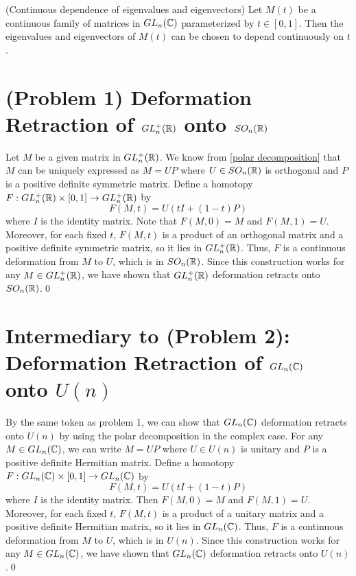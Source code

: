 \documentclass[main.tex]{subfiles}
\begin{document}
\begin{theorem}
    (Continuous dependence of eigenvalues and eigenvectors) Let $M(t)$ be a continuous family of matrices in $GL_n(\mathbb C)$ parameterized by $t \in [0,1]$. Then the eigenvalues and eigenvectors of $M(t)$ can be chosen to depend continuously on $t$.
\end{theorem}

\section{\textbf{(Problem 1)} Deformation Retraction of $GL_n^+(\mathbb R)$ onto $SO_n(\mathbb R)$}

Let $M$ be a given matrix in $GL_n^+(\mathbb R)$. We know from \ref{polar decomposition} that $M$ can be uniquely expressed as $M=UP$ where $U \in SO_n(\mathbb R)$ is orthogonal and $P$ is a positive definite symmetric matrix. Define a homotopy $F: GL_n^+(\mathbb R) \times [0,1] \to GL_n^+(\mathbb R)$ by
$$F(M,t) = U \left( tI + (1-t)P \right)$$
where $I$ is the identity matrix. Note that $F(M,0) = M$ and $F(M,1) = U$. Moreover, for each fixed $t$, $F(M,t)$ is a product of an orthogonal matrix and a positive definite symmetric matrix, so it lies in $GL_n^+(\mathbb R)$. Thus, $F$ is a continuous deformation from $M$ to $U$, which is in $SO_n(\mathbb R)$. Since this construction works for any $M \in GL_n^+(\mathbb R)$, we have shown that $GL_n^+(\mathbb R)$ deformation retracts onto $SO_n(\mathbb R)$.\newline \qed

\section{\texorpdfstring{Intermediary to \textbf{(Problem 2)}: Deformation Retraction of $GL_n(\mathbb C)$ onto $U(n)$}{Intermediary to (Problem 2): Deformation Retraction of GL_n(C) onto U(n)}}
By the same token as problem 1, we can show that $GL_n(\mathbb C)$ deformation retracts onto $U(n)$ by using the polar decomposition in the complex case. For any $M \in GL_n(\mathbb C)$, we can write $M = UP$ where $U \in U(n)$ is unitary and $P$ is a positive definite Hermitian matrix. Define a homotopy $F: GL_n(\mathbb C) \times [0,1] \to GL_n(\mathbb C)$ by
$$F(M,t) = U \left( tI + (1-t)P \right)$$
where $I$ is the identity matrix. Then $F(M,0) = M$ and $F(M,1) = U$. Moreover, for each fixed $t$, $F(M,t)$ is a product of a unitary matrix and a positive definite Hermitian matrix, so it lies in $GL_n(\mathbb C)$. Thus, $F$ is a continuous deformation from $M$ to $U$, which is in $U(n)$. Since this construction works for any $M \in GL_n(\mathbb C)$, we have shown that $GL_n(\mathbb C)$ deformation retracts onto $U(n)$.\newline \qed
\end{document}

